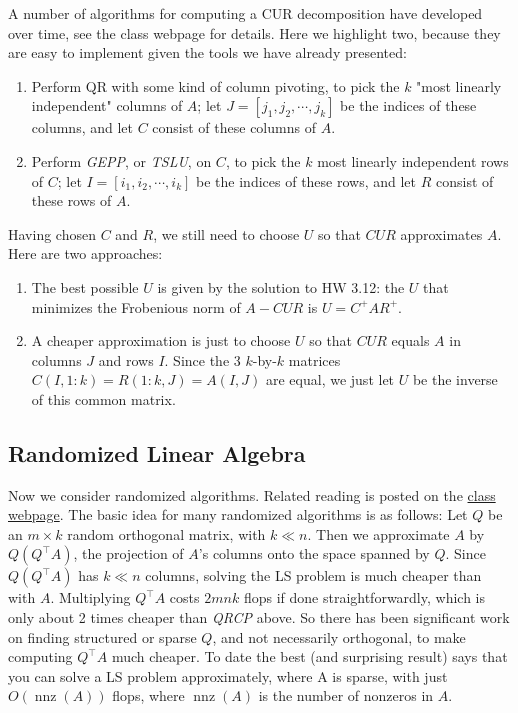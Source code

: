\documentclass[11pt]{article}
\numberwithin{equation}{section}
\begin{document}
A number of algorithms for computing a CUR decomposition have developed over time, see the class webpage for details. Here we highlight two, 
because they are easy to implement given the tools we have already presented: \begin{enumerate}
    \item Perform QR with some kind of column pivoting, to pick the $k$ "most linearly independent" columns of $A$; 
    let $J = [j_1, j_2, \cdots , j_k]$ be the indices of these columns, and let $C$ consist of these columns of $A$.
    \item Perform \textit{GEPP}, or \textit{TSLU}, on $C$, to pick the $k$ most linearly independent rows of $C$; 
    let $I = [i_1, i_2, \cdots , i_k]$ be the indices of these rows, and let $R$ consist of these rows of $A$.
\end{enumerate}
Having chosen $C$ and $R$, we still need to choose $U$ so that $CUR$ approximates $A$.
Here are two approaches: \begin{enumerate}
    \item The best possible $U$ is given by the solution to HW 3.12: the $U$ that minimizes the Frobenious norm of $A - CUR$ is $U=C^{+}AR^{+}$.
    \item A cheaper approximation is just to choose $U$ so that $CUR$ equals $A$ in columns $J$ and rows $I$. 
    Since the 3 $k$-by-$k$ matrices $C(I,1:k) = R(1:k,J) = A(I,J)$ are equal, we just let $U$ be the inverse of this common matrix.
\end{enumerate}

\subsection{Randomized Linear Algebra}
Now we consider randomized algorithms. Related reading is posted on the \href{https://people.eecs.berkeley.edu/~demmel/ma221_Fall20/}{class webpage}. 
The basic idea for many randomized algorithms is as follows: Let $Q$ be an $m \times k$ random orthogonal matrix, with $k \ll n$. 
Then we approximate $A$ by $Q\left(Q^{\top} A\right)$, the projection of $A$'s columns onto the space spanned by $Q$. 
Since $Q\left(Q^{\top} A\right)$ has $k \ll n$ columns, solving the LS problem is much cheaper than with $A$.
Multiplying $Q^\top A$ costs $2mnk$ flops if done straightforwardly, which is only about 2 times cheaper than \textit{QRCP} above. 
So there has been significant work on finding structured or sparse $Q$, and not necessarily orthogonal, to make computing $Q^\top A$ much cheaper. 
To date the best (and surprising result) says that you can solve a LS problem approximately, where A is sparse, with just $O(\operatorname{nnz}(A))$ flops,
where $\operatorname{nnz}(A)$ is the number of nonzeros in $A$.
\end{document}
